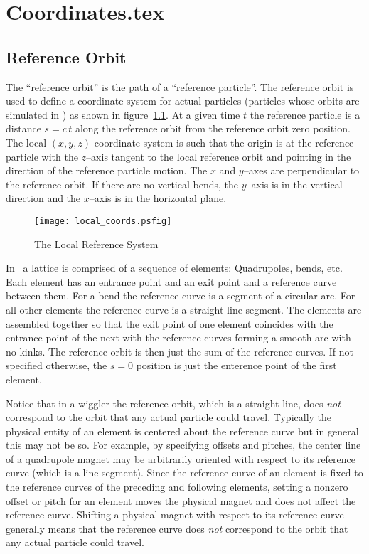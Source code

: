 \chapter{Coordinates.tex}

\section{Reference Orbit}
\label{s:ref}

The ``reference orbit'' is the path of a ``reference particle''.  The
reference orbit is used to define a coordinate system for actual
particles (particles whose orbits are simulated in \bmad) as shown in
figure~\ref{f:local_coords}. At a given time $t$ the reference
particle is a distance $s = c \, t$ along the reference orbit from the
reference orbit zero position. The local $(x, y, z)$ coordinate system
is such that the origin is at the reference particle with the
$z$--axis tangent to the local reference orbit and pointing in the
direction of the reference particle motion. The $x$ and $y$--axes are
perpendicular to the reference orbit. If there are no vertical bends,
the $y$--axis is in the vertical direction and the $x$--axis is in the
horizontal plane.

\begin{figure}[tb]
\centering
\texttt{[image: local\_coords.psfig]}
\caption{The Local Reference System}
\label{f:local_coords}
\end{figure}

In \bmad\ a lattice is comprised of a sequence of elements:
Quadrupoles, bends, etc. Each element has an entrance point and an
exit point and a reference curve between them. For a bend the
reference curve is a segment of a circular arc. For all other elements
the reference curve is a straight line segment. The elements are assembled
together so that the exit point of one element coincides with the
entrance point of the next with the reference curves forming a smooth
arc with no kinks. The reference orbit is then just the sum of the
reference curves. If not specified otherwise, the $s = 0$ position is
just the enterence point of the first element.

Notice that in a wiggler the reference orbit, which is a straight
line, does {\em not} correspond to the orbit that any actual particle
could travel. Typically the physical entity of an element is centered
about the reference curve but in general this may not be so. For
example, by specifying offsets and pitches, the center line of a
quadrupole magnet may be arbitrarily oriented with respect to its
reference curve (which is a line segment). Since the reference curve
of an element is fixed to the reference curves of the preceding and
following elements, setting a nonzero offset or pitch for an element
moves the physical magnet and does not affect the reference
curve. Shifting a physical magnet with respect to its reference curve
generally means that the reference curve does {\em not} correspond to
the orbit that any actual particle could travel.


